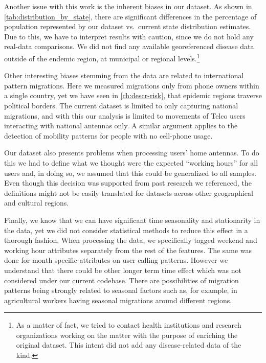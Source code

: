 Another issue with this work is the inherent biases in our dataset.
As shown in \cref{tab:distribution_by_state}, there are significant differences in the percentage of population represented by our dataset vs.\ current state distribution estimates.
Due to this, we have to interpret results with caution, since we do not hold any real-data comparisons.
We did not find any available georeferenced disease data outside of the endemic region, at municipal or regional levels.\footnote{As a matter of fact, we tried to contact health institutions and research organizations working on the matter with the purpose of enriching the original dataset.
This intent did not add any disease-related data of the kind.}

Other interesting biases stemming from the data are related to international pattern migrations.
Here we measured migrations only from phone owners within a single country, yet we have seen in \cref{ch:descr-risk}, that  epidemic regions traverse political borders.
The current dataset is limited to only capturing national migrations, and with this our analysis is limited to movements of Telco users interacting with national antennas only.
A similar argument applies to the detection of mobility patterns for people with no cell-phone usage.

Our dataset also presents problems when processing users' home antennas.
To do this we had to define what we thought were the expected ``working hours'' for all users and, in doing so, we assumed that this could be generalized to all samples. %
Even though this decision was supported from past research we referenced, the definitions might not be easily translated for datasets across other geographical and cultural regions.


Finally, we know that we can have significant time seasonality and stationarity in the data, yet we did not consider statistical methods to reduce this effect in a thorough fashion. %
When processing the data, we specifically tagged weekend and working hour attributes separately from the rest of the features.
The same was done for month specific attributes on user calling patterns.
However we understand that there could be other longer term time effect which was not considered under our current codebase. %
There are possibilities of migration patterns being strongly related to seasonal factors such as, for example, in agricultural workers having seasonal migrations around different regions.%

